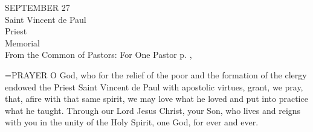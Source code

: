 \begin{center}\normalsize SEPTEMBER 27\\
\footnotesize Saint Vincent de Paul\\
\footnotesize Priest\\
\footnotesize Memorial\\
\footnotesize From the Common of Pastors: For One Pastor p.   ,\\
\end{center}

\hangindent=\parindent \small{PRAYER 
O God, who for the relief of the poor
and the formation of the clergy
endowed the Priest Saint Vincent de Paul
with apostolic virtues,
grant, we pray, that, afire with that same spirit,
we may love what he loved
and put into practice what he taught.
Through our Lord Jesus Christ, your Son,
who lives and reigns with you in the unity of the Holy Spirit,
one God, for ever and ever.\\}
 

